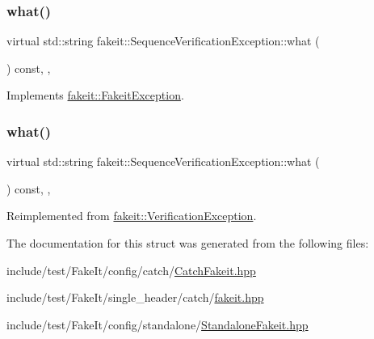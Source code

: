 \subsubsection{\texorpdfstring{what()}{what()}\hspace{0.1cm}{\footnotesize\ttfamily [1/2]}}
{\footnotesize\ttfamily virtual std\+::string fakeit\+::\+Sequence\+Verification\+Exception\+::what (\begin{DoxyParamCaption}{ }\end{DoxyParamCaption}) const\hspace{0.3cm}{\ttfamily [inline]}, {\ttfamily [override]}, {\ttfamily [virtual]}}



Implements \mbox{\hyperlink{structfakeit_1_1FakeitException_a02ef6315b98e4382157c2106a62f7718}{fakeit\+::\+Fakeit\+Exception}}.

\mbox{\label{structfakeit_1_1SequenceVerificationException_a0346dd2569b455290bde744e57e87e89}} 
\subsubsection{\texorpdfstring{what()}{what()}\hspace{0.1cm}{\footnotesize\ttfamily [2/2]}}
{\footnotesize\ttfamily virtual std\+::string fakeit\+::\+Sequence\+Verification\+Exception\+::what (\begin{DoxyParamCaption}{ }\end{DoxyParamCaption}) const\hspace{0.3cm}{\ttfamily [inline]}, {\ttfamily [override]}, {\ttfamily [virtual]}}



Reimplemented from \mbox{\hyperlink{structfakeit_1_1VerificationException_aba8bb8f60a0427c01868a0ab0388fd0b}{fakeit\+::\+Verification\+Exception}}.



The documentation for this struct was generated from the following files\+:\begin{DoxyCompactItemize}
\item 
include/test/\+Fake\+It/config/catch/\mbox{\hyperlink{CatchFakeit_8hpp}{Catch\+Fakeit.\+hpp}}\item 
include/test/\+Fake\+It/single\+\_\+header/catch/\mbox{\hyperlink{single__header_2catch_2fakeit_8hpp}{fakeit.\+hpp}}\item 
include/test/\+Fake\+It/config/standalone/\mbox{\hyperlink{StandaloneFakeit_8hpp}{Standalone\+Fakeit.\+hpp}}\end{DoxyCompactItemize}
